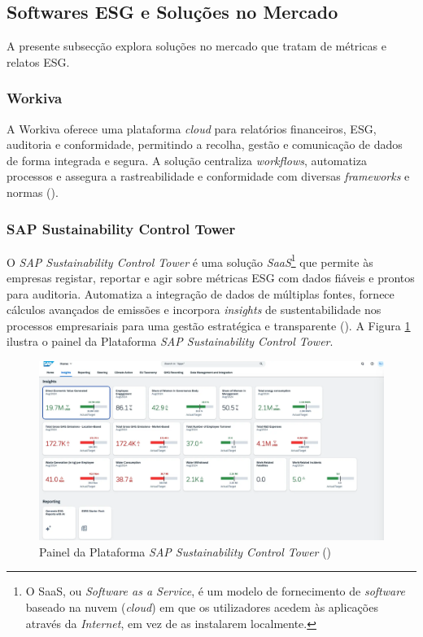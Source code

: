 
\subsection{Softwares \gls{ESG} e Soluções no Mercado}
\label{subsec: SESGSM}

A presente subsecção explora soluções no mercado que tratam de métricas e relatos \gls{ESG}.

\subsubsection{Workiva}

A Workiva oferece uma plataforma \textit{cloud} para relatórios financeiros, \gls{ESG}, auditoria e conformidade, permitindo a recolha, gestão e comunicação de dados de forma integrada e segura. A solução centraliza \textit{workflows}, automatiza processos e assegura a rastreabilidade e conformidade com diversas \textit{frameworks} e normas (\cite{Workiva2025}).

\subsubsection{SAP Sustainability Control Tower}

O \textit{SAP Sustainability Control Tower} é uma solução \textit{\gls{SaaS}}\footnote{O SaaS, ou \textit{Software as a Service}, é um modelo de fornecimento de \textit{software} baseado na nuvem (\textit{cloud}) em que os utilizadores acedem às aplicações através da \textit{Internet}, em vez de as instalarem  localmente.} que permite às empresas registar, reportar e agir sobre métricas \gls{ESG} com dados fiáveis e prontos para auditoria. Automatiza a integração de dados de múltiplas fontes, fornece cálculos avançados de emissões e incorpora \textit{insights} de sustentabilidade nos processos empresariais para uma gestão estratégica e transparente (\cite{SAP2025}). A Figura \ref{fig:sap_sustainability_control_tower} ilustra o painel da Plataforma \textit{SAP Sustainability Control Tower}.

\begin{figure}[h]
    \centering
    \includegraphics[width=5.75in]{frontmatter/assets/SAP.png}
    \caption{Painel da Plataforma \textit{SAP Sustainability Control Tower} (\cite{SAP2025})}
    \label{fig:sap_sustainability_control_tower}
\end{figure}

